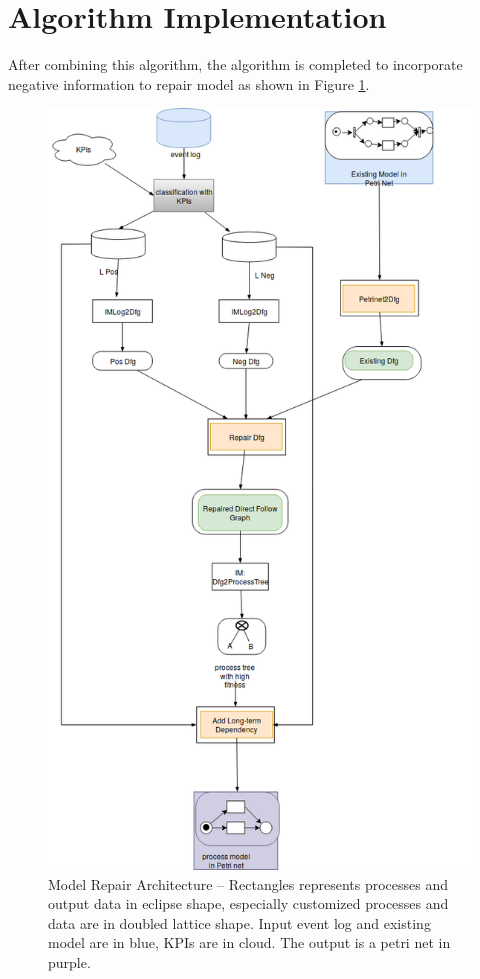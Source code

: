 \documentclass[]{article}
\begin{document}
\section{Algorithm Implementation}
After combining this algorithm, the algorithm is completed to incorporate negative information to repair model as shown in Figure \ref{fig:architecture}.
\begin{figure}
	\includegraphics[width=\textwidth, height=\textheight]{FD_architecture_detail_02.png}
	\caption[Model Repair Architecture]{Model Repair Architecture -- \small Rectangles represents processes and output data in eclipse shape, especially customized processes and data are in doubled lattice shape. Input event log and existing model are in blue, KPIs are in cloud. The output is a petri net in purple. }
	\label{fig:architecture}
\end{figure} 
\end{document}
